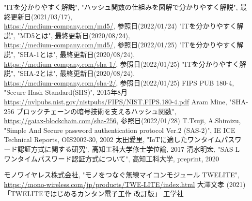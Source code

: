 \documentclass{thesis}
\begin{document}
\begin{thebibliography}{99}
"ITを分かりやすく解説", "ハッシュ関数の仕組みを図解で分かりやすく解説", 最終更新日(2021/03/17), \\
\url{https://medium-company.com/md5/}, 参照日(2022/01/24)
%
"ITを分かりやすく解説", "MD5とは", 最終更新日(2020/08/24), \\
\url{https://medium-company.com/md5/}, 参照日(2022/01/25)
%
"ITを分かりやすく解説", "SHA-1とは", 最終更新日(2020/08/24), \\
\url{https://medium-company.com/sha-1/}, 参照日(2022/01/25)
%
"ITを分かりやすく解説", "SHA-2とは", 最終更新日(2020/08/24), \\
\url{https://medium-company.com/sha-2/}, 参照日(2022/01/25)
%
FIPS PUB 180-4, "Secure Hash Standard(SHS)", 2015年8月 \\
\url{https://nvlpubs.nist.gov/nistpubs/FIPS/NIST.FIPS.180-4.pdf} 
%
Aram Mine, "SHA-256 ブロックチェーンの暗号技術を支えるハッシュ関数", \\
\url{https://gaiax-blockchain.com/sha-256}, 参照日(2022/01/28)
%
T.Tsuji, A.Shimizu, "Simple And Secure password authentication protocol Ver.2 (SAS-2)", IE ICE Technical Reports, OIS2002-30, 2002
%
太田愛里, "IoTに適したワンタイムパスワード認証方式に関する研究", 高知工科大学修士学位論, 2017
%
清水明宏, "SAS-L ワンタイムパスワード認証方式について", 高知工科大学, preprint, 2020

モノワイヤレス株式会社, "モノをつなぐ無線マイコンモジュール TWELITE", \\
\url{https://mono-wireless.com/jp/products/TWE-LITE/index.html}
%
大澤文孝 (2021) 「TWELITEではじめるカンタン電子工作 改訂版」 工学社
%
\end{thebibliography}

\appendix
\end{document}

